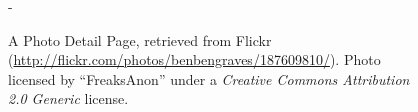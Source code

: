 \begin{figure}
\begin{adjustwidth*}{0em}{-\wholemargin}
\begin{minipage}[t]{0.475\wholewidth}
      \caption[Flickr Photo Detail Page]{%
         A Photo Detail Page,
         retrieved from Flickr
         (\url{http://flickr.com/photos/benbengraves/187609810/}).
         Photo licensed by ``FreaksAnon'' under a \emph{Creative Commons
         Attribution 2.0 Generic} license.}
      \label{figure:scrsh.flickr.photo.detail}
    \end{minipage}
  \end{adjustwidth*}
\end{figure}
